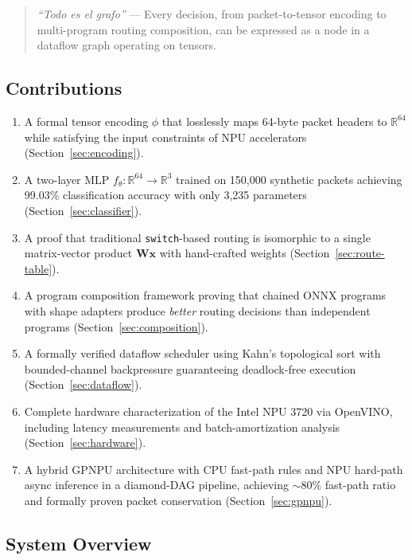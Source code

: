 \documentclass[11pt,a4paper,twoside]{article}
\theoremstyle{definition}
\theoremstyle{remark}
\newcommand{\R}{\mathbb{R}}
\newcommand{\mat}[1]{\mathbf{#1}}
\newcommand{\vect}[1]{\mathbf{#1}}
\begin{document}
\begin{quote}
\emph{``Todo es el grafo''} --- Every decision, from packet-to-tensor encoding to multi-program routing composition, can be expressed as a node in a dataflow graph operating on tensors.
\end{quote}

\subsection{Contributions}

\begin{enumerate}[label=\textbf{C\arabic*.}]
  \item A formal tensor encoding $\phi$ that losslessly maps 64-byte packet headers to $\R^{64}$ while satisfying the input constraints of NPU accelerators (Section~\ref{sec:encoding}).
  \item A two-layer MLP $f_\theta: \R^{64} \to \R^3$ trained on 150{,}000 synthetic packets achieving 99.03\% classification accuracy with only 3{,}235 parameters (Section~\ref{sec:classifier}).
  \item A proof that traditional \texttt{switch}-based routing is isomorphic to a single matrix-vector product $\mat{W}\vect{x}$ with hand-crafted weights (Section~\ref{sec:route-table}).
  \item A program composition framework proving that chained ONNX programs with shape adapters produce \emph{better} routing decisions than independent programs (Section~\ref{sec:composition}).
  \item A formally verified dataflow scheduler using Kahn's topological sort with bounded-channel backpressure guaranteeing deadlock-free execution (Section~\ref{sec:dataflow}).
  \item Complete hardware characterization of the Intel NPU 3720 via OpenVINO, including latency measurements and batch-amortization analysis (Section~\ref{sec:hardware}).
  \item A hybrid GPNPU architecture with CPU fast-path rules and NPU hard-path async inference in a diamond-DAG pipeline, achieving ${\sim}80\%$ fast-path ratio and formally proven packet conservation (Section~\ref{sec:gpnpu}).
\end{enumerate}

\subsection{System Overview}
\end{document}
